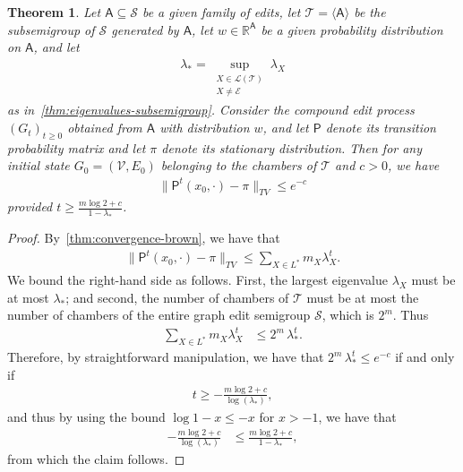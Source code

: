 \documentclass[11pt,a4paper]{article}
\newtheorem{theorem}{Theorem}[section]
\begin{document}
\begin{theorem}\label{thm:mixing-time-subsemigroup}
    Let $\mathsf{A}\subseteq\mathcal{S}$ be a given family of edits, let $\mathcal{T}=\langle \mathsf{A}\rangle$ be the subsemigroup of $\mathcal{S}$ generated by $\mathsf{A}$, let $w\in\mathbb{R}^{\mathsf{A}}$ be a given probability distribution on $\mathsf{A}$, and let
        \begin{align*}
            \lambda_\ast = \sup_{ \substack{X\in\mathcal{L}(\mathcal{T}) \\ X\neq \mathcal{E}}} \lambda_X
        \end{align*}
    as in~\cref{thm:eigenvalues-subsemigroup}. Consider the compound edit process $(G_t)_{t\geq 0}$ obtained from $\mathsf{A}$ with distribution $w$, and let $\mathsf{P}$ denote its transition probability matrix and let $\pi$ denote its stationary distribution. Then for any initial state $G_0 = (\mathcal{V}, E_0)$ belonging to the chambers of $\mathcal{T}$ and $c>0$, we have
        \begin{align}\label{eq:mixing-time-bound-compound}
            \|\mathsf{P}^t(x_0, \cdot) - \pi\|_{TV}\leq e^{-c}
        \end{align}
    provided $t\geq \frac{m\log{2} + c}{1-\lambda_\ast}$.
\end{theorem}

\begin{proof}
    By~\cref{thm:convergence-brown}, we have that
        \begin{align*}
            \|\mathsf{P}^t(x_0, \cdot) - \pi\|_{TV} \leq \sum_{X\in L^\ast} m_X\lambda_X^t.
        \end{align*}
    We bound the right-hand side as follows. First, the largest eigenvalue $\lambda_X$ must be at most $\lambda_\ast$; and second, the number of chambers of $\mathcal{T}$ must be at most the number of chambers of the entire graph edit semigroup $\mathcal{S}$, which is $2^m$. Thus
        \begin{align*}
            \sum_{X\in L^\ast} m_X\lambda_X^t &\leq 2^m\,\lambda_\ast ^t.
        \end{align*}
    Therefore, by straightforward manipulation, we have that $2^m\,\lambda_\ast ^t\leq e^{-c}$ if and only if 
        \begin{align*}
            t\geq -\frac{m\log{2} + c}{\log(\lambda_\ast)},
        \end{align*}
    and thus by using the bound $\log{1-x}\leq -x$ for $x>-1$, we have that
        \begin{align*}
            -\frac{m\log{2} + c}{\log(\lambda_\ast)} &\leq \frac{m\log{2} + c}{1-\lambda_\ast},
        \end{align*}
    from which the claim follows.
\end{proof}
\end{document}
